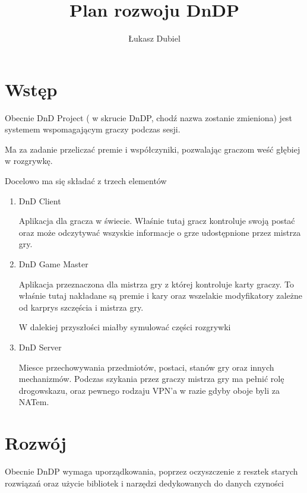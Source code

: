 \documentclass[16pt]{article}
\author{Łukasz Dubiel}
\title{Plan rozwoju DnDP}
\begin{document}
\maketitle
\newpage
\section{Wstęp}

Obecnie DnD Project ( w skrucie DnDP, chodź nazwa zostanie zmieniona)
jest systemem wspomagającym graczy podczas sesji.

Ma za zadanie przeliczać premie i współczyniki, pozwalając graczom weść głębiej w rozgrywkę.

Docelowo ma się składać z trzech elementów
\begin{enumerate}
\item{DnD Client}

Aplikacja dla gracza w świecie. Właśnie tutaj gracz kontroluje swoją postać oraz może odczytywać wszyskie informacje o grze udostępnione przez mistrza gry.

\item{DnD Game Master}

Aplikacja przeznaczona dla mistrza gry z której kontroluje karty graczy. To właśnie tutaj nakładane są premie i kary oraz wszelakie modyfikatory zależne od karprys szczęścia i mistrza gry. 

W dalekiej przyszłości miałby symulować części rozgrywki

\item{DnD Server}

Miesce przechowywania przedmiotów, postaci, stanów gry oraz innych mechanizmów. Podczas szykania przez graczy mistrza gry ma pełnić rolę drogowskazu, oraz pewnego rodzaju VPN'a w razie gdyby oboje byli za NATem.
\end{enumerate}



\section{Rozwój}

Obecnie DnDP wymaga uporządkowania, poprzez oczyszczenie z resztek starych rozwiązań oraz użycie bibliotek i narzędzi dedykowanych do danych czyności
\end{document}
